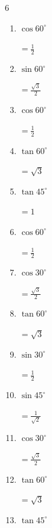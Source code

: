 \begin{multicols}{6}
\begin{enumerate}
        $\displaystyle =\frac{1}{2}$

\columnbreak %

  \item $\displaystyle \cos{60^\circ}$

        $\displaystyle =\frac{1}{2}$

  \item $\displaystyle \sin{60^\circ}$

        $\displaystyle =\frac{\sqrt{3}}{2}$

  \item $\displaystyle \cos{60^\circ}$

        $\displaystyle =\frac{1}{2}$

  \item $\displaystyle \tan{60^\circ}$

        $\displaystyle =\sqrt{3}$

  \item $\displaystyle \tan{45^\circ}$

        $\displaystyle =1$

  \item $\displaystyle \cos{60^\circ}$

        $\displaystyle =\frac{1}{2}$

  \item $\displaystyle \cos{30^\circ}$

        $\displaystyle =\frac{\sqrt{3}}{2}$

  \item $\displaystyle \tan{60^\circ}$

        $\displaystyle =\sqrt{3}$

  \item $\displaystyle \sin{30^\circ}$

        $\displaystyle =\frac{1}{2}$

  \item $\displaystyle \sin{45^\circ}$

        $\displaystyle =\frac{1}{\sqrt{2}}$

  \item $\displaystyle \cos{30^\circ}$

        $\displaystyle =\frac{\sqrt{3}}{2}$

  \item $\displaystyle \tan{60^\circ}$

        $\displaystyle =\sqrt{3}$

  \item $\displaystyle \tan{45^\circ}$


\end{enumerate}
\end{multicols}
